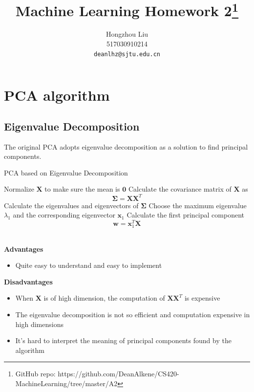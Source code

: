 \documentclass{article}
\title{Machine Learning Homework 2\thanks{GitHub repo: https://github.com/DeanAlkene/CS420-MachineLearning/tree/master/A2}}
\author{
  Hongzhou Liu \\
  517030910214 \\
  \texttt{deanlhz@sjtu.edu.cn} \\
}
\begin{document}
\maketitle

\section{PCA algorithm}
\subsection{Eigenvalue Decomposition}
The original PCA adopts eigenvalue decomposition as a solution to find principal components.
\begin{algorithm}[htbp]
  \caption{PCA based on Eigenvalue Decomposition}
  \label{alg:sc-ed}
  \vspace{0.25\baselineskip}
  \BlankLine
  Normalize $\mathbf{X}$ to make sure the mean is $\mathbf{0}$
  \BlankLine
  Calculate the covariance matrix of $\mathbf{X}$ as $$\mathbf{\Sigma}=\mathbf{XX}^T$$
  \BlankLine
  Calculate the eigenvalues and eigenvectors of $\mathbf{\Sigma}$
  \BlankLine
  Choose the maximum eigenvalue $\lambda_1$ and the corresponding eigenvector $\mathbf{x}_1$
  \BlankLine
  Calculate the first principal component
  $$\mathbf{w}=\mathbf{x}_1^T\mathbf{X}$$\\
\end{algorithm}
\par \textbf{Advantages}
\begin{itemize}
  \item Quite easy to understand and easy to implement
\end{itemize}
\par \textbf{Disadvantages}
\begin{itemize}
  \item When $\mathbf{X}$ is of high dimension, the computation of $\mathbf{XX}^T$ is expensive
  \item The eigenvalue decomposition is not so efficient and computation expensive in high dimensions
  \item It's hard to interpret the meaning of principal components found by the algorithm
\end{itemize}
\end{document}
